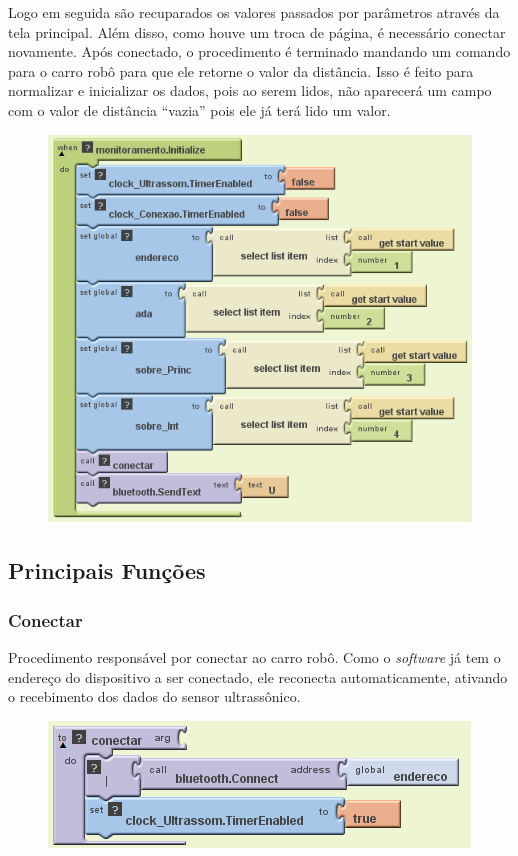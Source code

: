 \documentclass[portugues, brazil, a4paper,12pt]{article}
\begin{document}
Logo em seguida são recuparados os valores passados por parâmetros através da tela principal. Além disso, como houve um troca de página, é necessário conectar novamente.
Após conectado, o procedimento é terminado mandando um comando para o carro robô para que ele retorne o valor da distância. Isso é feito para normalizar e inicializar os dados, pois ao serem lidos, não aparecerá um campo com o valor de distância ``vazia'' pois ele já terá lido um valor.

\begin{figure}[H]
	\centering
	\includegraphics[scale=.8]{img/monitoramento/inicializacao.png}
	
\end{figure}

\subsection{Principais Funções}
\subsubsection{Conectar}
Procedimento responsável por conectar ao carro robô. Como o \textit{software} já tem o endereço do dispositivo a ser conectado, ele reconecta automaticamente, ativando o recebimento dos dados do sensor ultrassônico.

\begin{figure}[H]
	\centering
	\includegraphics[scale=.8]{img/monitoramento/conectar.png}
	
\end{figure}
\end{document}
